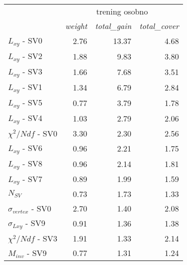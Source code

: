 \begin{table}[ht]
\centering
\begin{tabular}{lrrr}
\toprule
{} & \multicolumn{3}{c}{trening osobno} \\
{} & \textit{weight} & \textit{total\_gain} & \textit{total\_cover} \\
\midrule
$L_{xy}$ - SV0          &         2.76 &            13.37 &              4.68 \\
$L_{xy}$ - SV2          &         1.88 &             9.83 &              3.80 \\
$L_{xy}$ - SV3          &         1.66 &             7.68 &              3.51 \\
$L_{xy}$ - SV1          &         1.34 &             6.79 &              2.84 \\
\vspace{\everyNthRowSpace}
$L_{xy}$ - SV5          &         0.77 &             3.79 &              1.78 \\
$L_{xy}$ - SV4          &         1.03 &             2.79 &              2.06 \\
$\chi^2/Ndf$ - SV0      &         3.30 &             2.30 &              2.56 \\
$L_{xy}$ - SV6          &         0.96 &             2.21 &              1.75 \\
$L_{xy}$ - SV8          &         0.96 &             2.14 &              1.81 \\
\vspace{\everyNthRowSpace}
$L_{xy}$ - SV7          &         0.89 &             1.99 &              1.59 \\
$N_{SV}$                &         0.73 &             1.73 &              1.33 \\
$\sigma_{vertex}$ - SV0 &         2.70 &             1.40 &              2.08 \\
$\sigma_{Lxy}$ - SV9    &         0.91 &             1.36 &              1.38 \\
$\chi^2/Ndf$ - SV3      &         1.91 &             1.33 &              2.14 \\
$M_{inv}$ - SV9         &         0.77 &             1.31 &              1.24 \\


\end{tabular}
\end{table}
